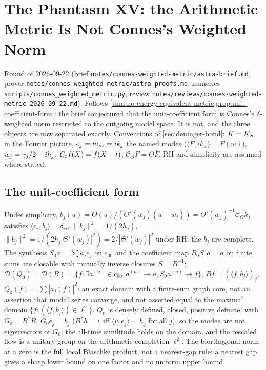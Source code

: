\section{The Phantasm XV: the Arithmetic Metric Is Not Connes's Weighted Norm}
\label{sec:connes-weighted-metric}

Round of 2026-09-22 (brief \texttt{notes/connes-weighted-metric/astra-brief.md}, prover
\texttt{notes/connes-weighted-metric/astra-proofs.md}, numerics \texttt{scripts/connes\_weighted\_metric.py}, review
\texttt{notes/reviews/connes-weighted-metric-2026-09-22.md}). Follows \cref{thm:no-energy-equivalent-metric,prop:unit-coefficient-form}:
the brief conjectured that the unit-coefficient form is Connes's $\delta$-weighted norm restricted to the outgoing model space. It
is not, and the three objects are now separated exactly. Conventions of \cref{sec:deninger-bond}: $K = K_S$ in the Fourier picture,
$e_j = m_{\rho_j} = ik_j$ the named modes ($\langle F,ik_w\rangle = F(w)$), $w_j = \gamma_{j}/2+ih_j$, $C_t f(X) = f(X+t)$,
$\mathcal C_\Theta F = \Theta\bar F$. RH and simplicity are assumed where stated.

\subsection{The unit-coefficient form}

\begin{theorem}
\label{thm:unit-coefficient-form-domain}
Under simplicity, $b_j(u) = \Theta(u)/(\Theta'(w_j)(u-w_j)) = \Theta'(w_j)^{-1}\mathcal C_\Theta k_j$ satisfies $\langle e_i,b_j\rangle = \delta_{ij}$,
$\|k_j\|^2 = 1/(2h_j)$, $\|b_j\|^2 = 1/(2h_j|\Theta'(w_j)|^2) = 2/|\Theta'(w_j)|^2$ under RH; the $b_j$ are complete. The synthesis $S_0a = \sum a_je_j$
on $c_{00}$ and the coefficient map $B_0S_0a = a$ on finite sums are closable with mutually inverse closures $S = B^{-1}$;
$\mathcal D(Q_0) = \mathcal D(B) = \{f: \exists a^{(n)}\in c_{00}, a^{(n)}\to a, S_0a^{(n)}\to f\}$, $Bf = (\langle f,b_j\rangle)_j$, $Q_0(f) = \sum|a_j(f)|^2$: an exact
domain with a finite-sum graph core, not an assertion that modal series converge, and not asserted equal to the maximal
domain $\{f:(\langle f,b_j\rangle)\in\ell^2\}$. $Q_0$ is densely defined, closed, positive definite, with $G_0 = B^{*}B$,
$G_0e_j = b_j$ ($B^{*}h = v$ iff $\langle v,e_j\rangle = h_j$ for all $j$), so the modes are not eigenvectors of $G_0$; the all-time
similitude holds on the domain, and the rescaled flow is a unitary group on the arithmetic completion $\ell^2$. The
biorthogonal norm at a zero is the full local Blaschke product, not a nearest-gap rule: a nearest gap gives a sharp lower bound
on one factor and no uniform upper bound.
\end{theorem}

